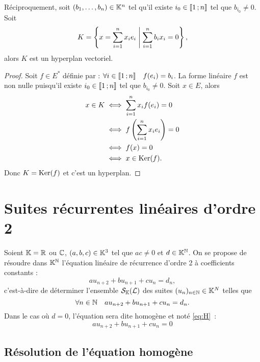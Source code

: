 Réciproquement, soit \((b_1, \ldots, b_n) \in \mathbb{K}^n\) tel qu'il existe \(i_0 \in 
\mathopen{\llbracket}1\mathclose{}\mathpunct{};n\mathclose{\rrbracket}\) tel que \(b_{i_0} \neq 0\). Soit
\begin{equation}
  K = \left\{x = \sum_{i=1}^n x_i e_i\mathrel{}\middle|\mathrel{}\sum_{i=1}^n b_i x_i =0\right\},
\end{equation}
alors \(K\) est un hyperplan vectoriel.
\begin{proof}
  Soit \(f \in E^*\) définie par : \(\forall i \in \mathopen{\llbracket}1\mathclose{}\mathpunct{};n\mathclose{\rrbracket} \quad 
  f(e_i)=b_i\). La forme linéaire \(f\) est non nulle puisqu'il existe \(i_0 \in 
  \mathopen{\llbracket}1\mathclose{}\mathpunct{};n\mathclose{\rrbracket}\) tel que \(b_{i_0} \neq 0\). Soit \(x \in E\), alors
  \begin{align}
    x \in K &\iff \sum_{i=1}^n x_i f(e_i)=0 \\
    &\iff f\left(\sum_{i=1}^n x_i e_i \right) =0\\
    &\iff f(x)=0\\
    &\iff x \in \operatorname{Ker}(f).
  \end{align}
  Donc \(K=\operatorname{Ker}(f)\) et c'est un hyperplan.
\end{proof}

\section{Suites récurrentes linéaires d'ordre 2}

Soient \(\mathbb{K}=\mathbb{R}\) ou \(\mathbb{C}\), \((a,b,c) \in \mathbb{K}^3\) tel que \(ac \neq 0\) et \(d 
\in \mathbb{K}^{\mathbb{N}}\). On se propose de résoudre dans \(\mathbb{K}^{\mathbb{N}}\) l'équation linéaire de 
récurrence d'ordre 2 à coefficients constants :
\begin{equation}
  au_{n+2}+bu_{n+1}+cu_n = d_n \label{eq:S} \tag{\(\Lb\)},
\end{equation}
c'est-à-dire de déterminer l'ensemble \(\mathcal{S}_{\mathbb{K}}(\mathcal{L})\) des suites \((u_n)_{n \in 
\mathbb{N}} \in \mathbb{K}^N\) telles que
\begin{equation}
  \forall n \in \mathbb{N} \quad au_{n+2}+bu_{n+1}+cu_n = d_n.
\end{equation}
Dans le cas où \(d=0\), l'équation sera dite homogène et noté \eqref{eq:H}~:
\begin{equation}
  au_{n+2}+bu_{n+1}+cu_n = 0 \label{eq:H} \tag{\(\H\)}
\end{equation}

\subsection{Résolution de l'équation homogène}

